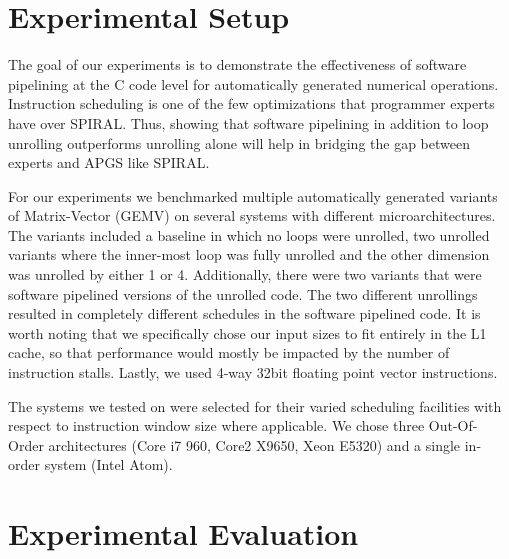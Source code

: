 \documentclass[10pt]{article}
\begin{document}
\section{Experimental Setup}

The goal of our experiments is to demonstrate the effectiveness of software
pipelining at the C code level for automatically generated numerical
operations. Instruction scheduling is one of the few optimizations that programmer experts
have over SPIRAL. Thus, showing that software pipelining in addition to loop
unrolling outperforms unrolling alone will help in bridging the gap between
experts and APGS like SPIRAL.

For our experiments we benchmarked multiple automatically generated variants
of Matrix-Vector (GEMV) on several systems with different
microarchitectures. The variants included a baseline in which no loops were
unrolled, two unrolled variants where the inner-most loop was fully unrolled
and the other dimension was unrolled by either 1 or 4. Additionally, there
were two variants that were software pipelined versions of the unrolled
code. The two different unrollings resulted in completely different schedules
in the software pipelined code. It is worth noting that we specifically chose
our input sizes to fit entirely in the L1 cache, so that performance would
mostly be impacted by the number of instruction stalls. Lastly, we used
4-way 32bit floating point vector instructions.

The systems we tested on were selected for their varied scheduling
facilities with respect to instruction window size where applicable. We chose three
Out-Of-Order architectures (Core i7 960, Core2 X9650, Xeon E5320) and a single
in-order system (Intel Atom).


\section{Experimental Evaluation}
\end{document}
